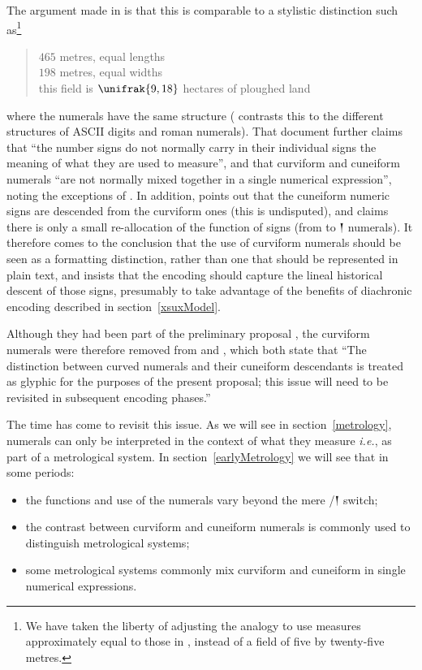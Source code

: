 \documentclass[10pt, a4paper, twoside]{article}
\newcommand\oneAšC{{\proposalfont\symbol{"12550}}} %
\newcommand{\idest}{\emph{i.e.}}
\begin{document}
The argument made in \cite[4]{L2/04-099} is that this is comparable to a stylistic distinction such as\footnote{We
have taken the liberty of adjusting the analogy to use measures approximately equal to those in \cite{P020054},
instead of a field of five by twenty-five metres.}
\begin{quote}
$465$ metres, equal lengths\\
$198$ metres, equal widths\\
this field is $\unifrak{9,18}$ hectares of ploughed land
\end{quote}
where the numerals have the same structure (\cite{L2/04-099} contrasts this to the different structures
of ASCII digits and roman numerals).
That document further claims that ``the number signs do not normally carry in their individual signs the
meaning of what they are used to measure'', and that curviform and cuneiform numerals ``are not normally mixed together
in a single numerical expression'', noting the exceptions of \cites{P232278}{P232280}.
In addition, \cite[4]{L2/04-099} points out that the cuneiform numeric signs are descended from
the curviform ones (this is undisputed),
and claims there is only a small re-allocation of the function of signs
(from \oneAšC{} to {\xsuxfont 𒁹} numerals).
It therefore comes to the conclusion that the use of curviform
numerals should be seen as a formatting distinction,
rather than one that should be represented in plain text,
and insists that the encoding should capture the lineal
historical descent of those signs, presumably to take
advantage of the benefits of diachronic encoding described
in section~\ref{xsuxModel}.

Although they had been part of the preliminary proposal \cite{L2/03-393R},
the curviform numerals were therefore removed from \cite{L2/04-036} and \cite{L2/04-189},
which both state that ``The distinction between curved numerals and their cuneiform descendants
is treated as glyphic for the purposes of the present proposal;
this issue will need to be revisited in subsequent encoding phases.''

The time has come to revisit this issue.
As we will see in section~\ref{metrology},
numerals can only be interpreted in the context of what they measure \idest,
as part of a metrological system.
In section~\ref{earlyMetrology} we will see that in some periods:
\begin{itemize}[nosep]
  \item the functions and use of the numerals vary beyond the mere \oneAšC/{\xsuxfont 𒁹} switch;
  \item the contrast between curviform and cuneiform numerals is commonly used to distinguish metrological systems;
  \item some metrological systems commonly mix curviform and cuneiform in single numerical expressions.
\end{itemize}
\end{document}
